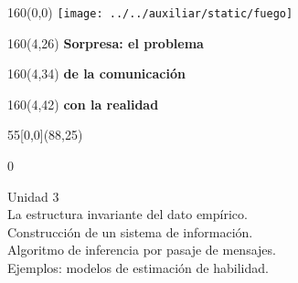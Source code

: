 \documentclass[shownotes,aspectratio=169]{beamer}
\begin{document}
\begin{frame}

\begin{textblock}{160}(0,0)
\texttt{[image: ../../auxiliar/static/fuego]}
\end{textblock}

\begin{textblock}{160}(4,26)
\LARGE \textcolor{black!5}{\fontsize{22}{0}\selectfont \textbf{Sorpresa: el problema}}
\end{textblock}
\begin{textblock}{160}(4,34)
\LARGE \textcolor{black!5}{\fontsize{22}{0}\selectfont \textbf{de la comunicación}}
\end{textblock}
\begin{textblock}{160}(4,42)
\LARGE \textcolor{black!5}{\fontsize{22}{0}\selectfont \textbf{con la realidad}}
\end{textblock}


\begin{textblock}{55}[0,0](88,25)
\begin{turn}{0}
\parbox{7cm}{\sloppy\setlength\parfillskip{0pt}
\textcolor{black!0}{Unidad 3} \\
\small\textcolor{black!5}{\hspace{-0.3cm}La estructura invariante del dato empírico.} \\
\small\textcolor{black!5}{\hspace{-0.3cm}Construcción de un sistema de información.}\\
\small\textcolor{black!5}{\hspace{-0.4cm}Algoritmo de inferencia por pasaje de mensajes.} \\
\small\textcolor{black!5}{\hspace{-0.6cm}Ejemplos: modelos de estimación de habilidad.} \\
}
\end{turn}
\end{textblock}

\end{frame}
\end{document}

